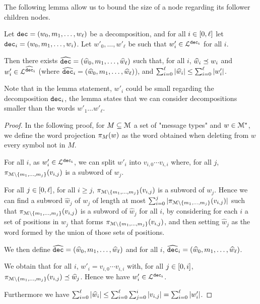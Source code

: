 

The following lemma allow us to bound the size of a node regarding its follower children nodes.

\begin{lemma}
	\label{lem:short-dec}
	Let $\decsymb = (w_0, m_1, \ldots, w_\ell)$ be a decomposition, and for all $i\in \nset{0}{\ell}$ let $\decsymb_i = (w_0, m_1, \ldots, w_i)$.
	Let $w'_0, \ldots, w'_\ell$ be such that $w'_i \in \langdec{\decsymb_i}$ for all $i$.
	
	Then there exists $\widehat{\decsymb} = (\widehat{w}_0, m_1, \ldots, \widehat{w}_\ell)$ such that, for all $i$, $\widehat{w}_i \subword w_i$ and $w'_i \in \langdec{\widehat{\decsymb}_i}$ (where $\widehat{\decsymb}_i = (\widehat{w}_0, m_1, \ldots, \widehat{w}_\ell)$), and $\sum_{i=0}^{\ell} \size{\widehat{w}_i} \leq \sum_{i=0}^{\ell} \size{w'_i}$. 
\end{lemma}

Note that in the lemma statement, $w'_i$ could be small regarding the decomposition $\decsymb_i$, the lemma states that we can consider decompositions smaller than the words $w'_1 \dots w'_\ell$.

\begin{proof}
	In the following proof, for $M \subseteq \messages$ a set of "message types" and $w \in \messages^*$, we define the word projection $\wordproj{w}{M}$ as the word obtained when deleting from $w$ every symbol not in $M$.
	
	For all $i$, as $w'_i \in \langdec{\decsymb_i}$, we can split $w'_i$ into $v_{i,0} \cdots v_{i,i}$ where, for all $j$, $\wordproj{v_{i,j}}{\messages\setminus\set{m_1, \ldots, m_{j}}}$ is a subword of $w_j$. 
	
	For all $j \in \nset{0}{\ell}$, for all $i\geq j$, $\wordproj{v_{i,j}}{\messages\setminus\set{m_1, \ldots, m_{j}}}$ is a subword of $w_j$.
	Hence we can find a subword $\widehat{w}_j$ of $w_j$ of length at most $\sum_{i=0}^{j} \size{\wordproj{v_{i,j}}{\messages\setminus\set{m_1, \ldots, m_{j}}}}$ such that $\wordproj{v_{i,j}}{\messages\setminus\set{m_1, \ldots, m_{j}}}$ is a subword of $\widehat{w}_j$ for all $i$, by considering for each $i$ a set of positions in $w_j$ that forms $\wordproj{v_{i,j}}{\messages\setminus\set{m_1, \ldots, m_{j}}}$, and then setting $\widehat{w}_j$ as the word formed by the union of those sets of positions.
	
	We then define $\widehat{\decsymb} = (\widehat{w}_0, m_1, \ldots, \widehat{w}_\ell)$ and for all $i$, $\widehat{\decsymb}_i = (\widehat{w}_0, m_1, \ldots, \widehat{w}_\ell)$.
	
	We obtain that for all $i$, $w'_i = v_{i,0} \cdots v_{i,i}$ with, for all $j \in \nset{0}{i}$, $\wordproj{v_{i,j}}{\messages\setminus\set{m_1, \ldots, m_j}} \subword \widehat{w}_j$. Hence we have $w'_i \in \langdec{\decsymb_i}$.
	
	Furthermore we have $\sum_{i=0}^{\ell} \size{\widehat{w}_i} \leq \sum_{i=0}^{\ell} \sum_{j=0}^i \size{v_{i,j}} = \sum_{i=0}^{\ell} \size{w'_i}$.
\end{proof}

